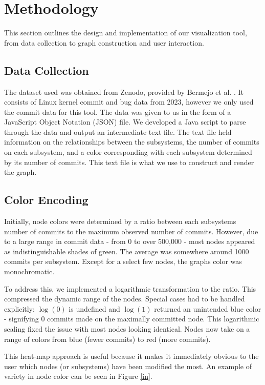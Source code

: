 \documentclass[conference]{IEEEtran}
\begin{document}
\section{Methodology}
\label{method}

This section outlines the design and implementation of our visualization tool, from data collection to graph construction and user interaction.

\subsection{Data Collection} 
The dataset used was obtained from Zenodo, provided by Bermejo et al. \cite{zenodo}. It consists of Linux kernel commit and bug data from 2023, however we only used the commit data for this tool. The data was given to us in the form of a JavaScript Object Notation (JSON) file. We developed a Java script to parse through the data and output an intermediate text file. The text file held information on the relationships between the subsystems, the number of commits on each subsystem, and a color corresponding with each subsystem determined by its number of commits. This text file is what we use to construct and render the graph.

\subsection{Color Encoding}
\label{colE}
Initially, node colors were determined by a ratio between each subsystems number of commits to the maximum observed number of commits. However, due to a large range in commit data - from 0 to over 500,000 - most nodes appeared as indistinguishable shades of green. The average was somewhere around 1000 commits per subsystem. Except for a select few nodes, the graphs color was monochromatic.

To address this, we implemented a logarithmic transformation to the ratio. This compressed the dynamic range of the nodes. Special cases had to be handled explicitly: $\log(0)$ is undefined and $\log(1)$ returned an unintended blue color - signifying $0$ commits made on the maximally committed node. This logarithmic scaling fixed the issue with most nodes looking identical. Nodes now take on a range of colors from blue (fewer commits) to red (more commits).

 This heat-map approach is useful because it makes it immediately obvious to the user which nodes (or subsystems) have been modified the most. An example of variety in node color can be seen in Figure \ref{in}.
\end{document}
